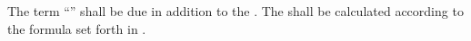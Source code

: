 The term “\bonusrent” shall be due in addition to the \annualcashrent. The \bonusrent shall be calculated according to the formula set forth in \exhibitB.
